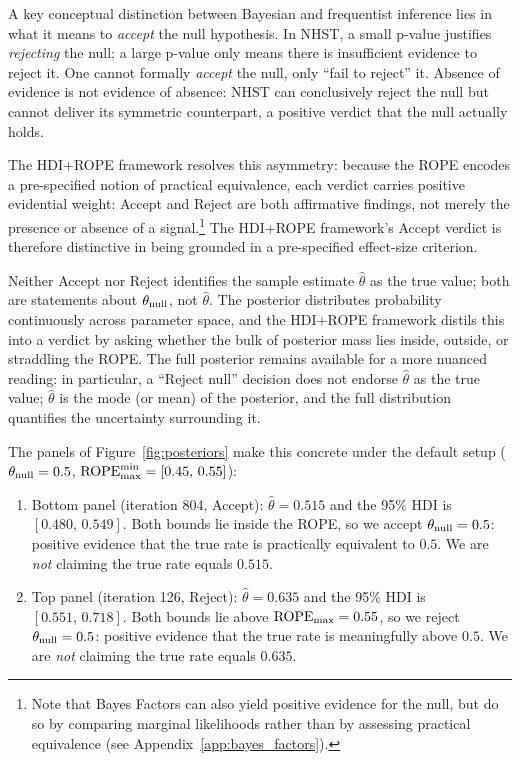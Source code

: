 A key conceptual distinction between Bayesian and frequentist inference lies in what it
means to \textit{accept} the null hypothesis. In NHST, a small p-value justifies
\textit{rejecting} the null; a large p-value only means there is insufficient evidence
to reject it. One cannot formally \textit{accept} the null, only ``fail to reject'' it.
Absence of evidence is not evidence of absence: NHST can conclusively reject
the null but cannot deliver its symmetric counterpart, a positive verdict that
the null actually holds.

The HDI+ROPE framework resolves this asymmetry: because the ROPE encodes a pre-specified
notion of practical equivalence, each verdict carries positive evidential weight:
Accept and Reject are both affirmative findings, not merely the presence or absence of a
signal.\footnote{Note that Bayes Factors can also yield positive evidence for the null, but do so
by comparing marginal likelihoods rather than by assessing practical equivalence
(see Appendix~\ref{app:bayes_factors}).} The HDI+ROPE framework's Accept verdict is therefore
distinctive in being grounded in a pre-specified effect-size criterion.

Neither Accept nor Reject identifies the sample estimate $\hat\theta$ as the
true value; both are statements about $\theta_{\rm null}$, not $\hat\theta$. The posterior
distributes probability continuously across parameter space, and the HDI+ROPE framework distils
this into a verdict by asking whether the bulk of posterior mass lies inside, outside, or
straddling the ROPE. The full posterior remains available for a more nuanced reading: in
particular, a ``Reject null'' decision does not endorse $\hat\theta$ as the true value;
$\hat\theta$ is the mode (or mean) of the posterior, and the full distribution
quantifies the uncertainty surrounding it.

The panels of Figure~\ref{fig:posteriors} make this concrete under the default setup
($\theta_{\rm null}=0.5$, $\mathrm{ROPE}_{\rm max}^{\rm min}=[0.45,\,0.55]$):

\begin{enumerate}[label=(\alph*)]
  \item Bottom panel (iteration 804, Accept):
        $\hat\theta=0.515$ and the 95\% HDI is
        $[0.480,\,0.549]$.
        Both bounds lie inside the ROPE, so we accept
        $\theta_{\rm null}=0.5$: positive evidence that the true rate is practically
        equivalent to $0.5$. We are \textit{not} claiming the true rate equals $0.515$.
  \item Top panel (iteration 126, Reject):
        $\hat\theta=0.635$ and the 95\% HDI is
        $[0.551,\,0.718]$.
        Both bounds lie above $\mathrm{ROPE}_{\rm max}=0.55$, so we reject
        $\theta_{\rm null}=0.5$: positive evidence that the true rate is meaningfully
        above $0.5$. We are \textit{not} claiming the true rate equals $0.635$.
\end{enumerate}

